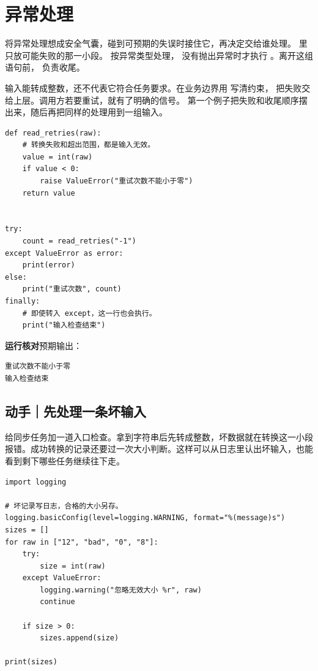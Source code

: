 \par


\section{异常处理}

将异常处理想成安全气囊，碰到可预期的失误时接住它，再决定交给谁处理。
 里只放可能失败的那一小段。 按异常类型处理，
没有抛出异常时才执行 。离开这组语句前， 负责收尾。

输入能转成整数，还不代表它符合任务要求。在业务边界用  写清约束，
把失败交给上层。调用方若要重试，就有了明确的信号。
第一个例子把失败和收尾顺序摆出来，随后再把同样的处理用到一组输入。


\begin{lstlisting}[title={\code{exception_path.py}}]
def read_retries(raw):
    # 转换失败和超出范围，都是输入无效。
    value = int(raw)
    if value < 0:
        raise ValueError("重试次数不能小于零")
    return value


try:
    count = read_retries("-1")
except ValueError as error:
    print(error)
else:
    print("重试次数", count)
finally:
    # 即使转入 except，这一行也会执行。
    print("输入检查结束")
\end{lstlisting}


\textbf{运行核对}\enspace 预期输出：
\begin{lstlisting}[language={},numbers=none]
重试次数不能小于零
输入检查结束
\end{lstlisting}

\par

\subsection*{动手｜先处理一条坏输入}

给同步任务加一道入口检查。拿到字符串后先转成整数，坏数据就在转换这一小段报错。成功转换的记录还要过一次大小判断。这样可以从日志里认出坏输入，也能看到剩下哪些任务继续往下走。

\begin{lstlisting}[title={\code{scan_sizes.py}}]
import logging

# 坏记录写日志，合格的大小另存。
logging.basicConfig(level=logging.WARNING, format="%(message)s")
sizes = []
for raw in ["12", "bad", "0", "8"]:
    try:
        size = int(raw)
    except ValueError:
        logging.warning("忽略无效大小 %r", raw)
        continue

    if size > 0:
        sizes.append(size)

print(sizes)
\end{lstlisting}

